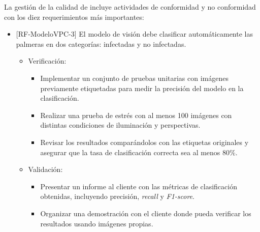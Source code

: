 \documentclass[
11pt, %
]{charter}
\begin{document}
La gestión de la calidad de incluye actividades de conformidad y no conformidad con los diez requerimientos más importantes:
\begin{itemize}[label={}]
  \item {[}RF-ModeloVPC-3{]} El modelo de visión debe clasificar automáticamente las palmeras en dos categorías: infectadas y no infectadas.
        \begin{itemize}
          \item Verificación:
                \begin{itemize}
                  \item Implementar un conjunto de pruebas unitarias con imágenes previamente etiquetadas para medir la precisión del modelo en la clasificación.
                  \item Realizar una prueba de estrés con al menos 100 imágenes con distintas condiciones de iluminación y perspectivas.
                  \item Revisar los resultados comparándolos con las etiquetas originales y asegurar que la tasa de clasificación correcta sea al menos 80\%.
                \end{itemize}
          \item Validación:
                \begin{itemize}
                  \item Presentar un informe al cliente con las métricas de clasificación obtenidas, incluyendo precisión, \textit{recall} y \textit{F1-score}.
                  \item Organizar una demostración con el cliente donde pueda verificar los resultados usando imágenes propias.
                \end{itemize}
        \end{itemize}


\end{itemize}
\end{document}
